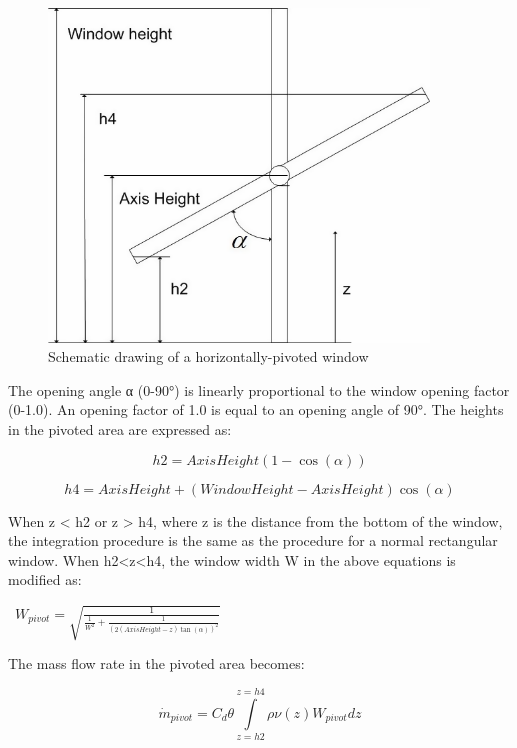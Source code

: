 \begin{figure}[hbtp] %
\centering
\includegraphics[width=0.9\textwidth, height=0.9\textheight, keepaspectratio=true]{media/image2703.png}
\caption{  Schematic drawing of a horizontally-pivoted window \protect \label{fig:schematic-drawing-of-a-horizontally-pivoted}}
\end{figure}

The opening angle α (0-90°) is linearly proportional to the window opening factor (0-1.0). An opening factor of 1.0 is equal to an opening angle of 90°. The heights in the pivoted area are expressed as:

\begin{equation}
h2 = AxisHeight(1 - \cos (\alpha ))
\end{equation}

\begin{equation}
h4 = AxisHeight + (WindowHeight - AxisHeight)\cos (\alpha )
\end{equation}

When z \textless{} h2 or z \textgreater{} h4, where z is the distance from the bottom of the window, the integration procedure is the same as the procedure for a normal rectangular window. When h2\textless{}z\textless{}h4, the window width W in the above equations is modified as:

~\({W_{pivot}} = \sqrt {\frac{1}{{\frac{1}{{{W^2}}} + \frac{1}{{{{(2(AxisHeight - z)\tan (\alpha ))}^2}}}}}}\)

The mass flow rate in the pivoted area becomes:

\begin{equation}
{\dot m_{pivot}} = {C_d}\theta \int\limits_{z = h2}^{z = h4} {\rho \nu (z){W_{pivot}}dz}
\end{equation}

